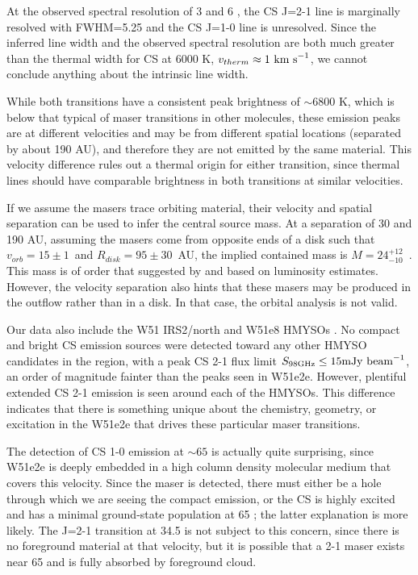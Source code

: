 \documentclass[twocolumn]{aastex62}
\begin{document}
At the observed spectral resolution of 3 \kms and 6 \kms, the CS J=2-1 line is
marginally resolved with FWHM=5.25 \kms and the CS J=1-0 line is unresolved.
Since the inferred line width and the observed spectral resolution are both
much greater than the thermal width for CS at 6000 K, $v_{therm}\approx1~\textrm{km~s}^{-1}$,
we cannot conclude anything about the intrinsic line width.

While both transitions have a consistent peak brightness of $\sim6800$ K,
which is below that typical of maser transitions in other molecules, these
emission peaks are at different velocities and may be from different spatial
locations (separated
by about 190 AU), and therefore they are not emitted by the same material.
This velocity difference rules out a thermal origin for either transition,
since thermal lines should have comparable brightness in both transitions
at similar velocities.

If we assume the masers trace orbiting material, their velocity and spatial
separation can be used to infer the central source mass.  At a separation of 30
\kms and 190 AU, assuming the masers come from opposite ends of a disk such
that $v_{orb}=15\pm1$~\kms and $R_{disk}=95\pm30$~AU, the implied contained mass is
$M=24_{-10}^{+12}$~\msun.  This mass is of order that suggested by
\citet{Ginsburg2017a} and \citet{Goddi2018a} based on luminosity estimates.
However, the velocity separation also hints that these masers may be produced
in the outflow rather than in a disk.  In that case, the orbital analysis
is not valid.


Our data also include the W51 IRS2/north and W51e8 HMYSOs
\citep{Ginsburg2017a}.  No compact and bright CS emission sources were detected
toward any other HMYSO candidates in the region, with a peak CS 2-1 flux limit
${S_{98 \mathrm{GHz}} \leq 15 \mathrm{mJy~\textrm{beam}^{-1}}}$, an order of magnitude
fainter than the peaks seen in W51e2e.  However, plentiful extended CS 2-1
emission is seen around each of the HMYSOs.  This difference indicates that
there is something unique about the chemistry, geometry, or excitation in the
W51e2e that drives these particular maser transitions.

The detection of CS 1-0 emission at $\sim65$ \kms is actually quite surprising,
since W51e2e is deeply embedded in a high column density molecular medium that
covers this velocity.  Since the maser is detected, there must either be a hole
through which we are seeing the compact emission, or the CS is highly excited
and has a minimal ground-state population at 65 \kms; the latter explanation is
more likely.  The J=2-1 transition at 34.5 \kms is not subject to this concern,
since there is no foreground material at that velocity, but it is possible that
a 2-1 maser exists near 65 \kms and is fully absorbed by foreground cloud.
\end{document}
